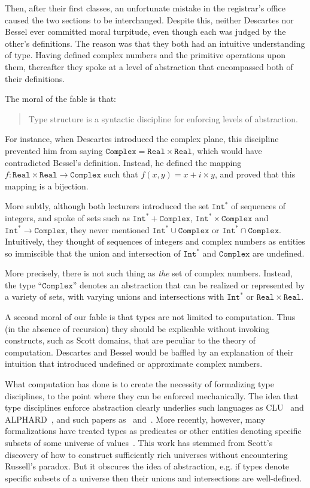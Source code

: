 \documentclass[sigplan,screen,nonacm,balance=false]{acmart}
\makeatletter
\theoremstyle{plain}
\newcommand{\eg}{e.g.\@\xspace}
\newcommand{\Real}{\mathtt{Real}}
\newcommand{\Complex}{\mathtt{Complex}}
\newcommand{\Int}{\mathtt{Int}}
\makeatother
\begin{document}
Then, after their first classes, an unfortunate mistake in the registrar's office caused the two sections to be interchanged.
Despite this, neither Descartes nor Bessel ever committed moral turpitude, even though each was judged by the other's definitions.
The reason was that they both had an intuitive understanding of type.
Having defined complex numbers and the primitive operations upon them, thereafter they spoke at a level of abstraction that encompassed both of their definitions.

The moral of the fable is that:

\begin{quote}
  Type structure is a syntactic discipline for enforcing levels of abstraction.
\end{quote}

For instance, when Descartes introduced the complex plane, this discipline prevented him from saying 
$\Complex = \Real \times \Real$,
which would have contradicted Bessel's definition.
Instead, he defined the mapping
$f : \Real \times \Real \to \Complex$ such that $f(x, y) = x + i \times y$,
and proved that this mapping is a bijection.

More subtly, although both lecturers introduced the set $\Int^*$ of sequences of integers, and spoke of sets such as $\Int^* + \Complex$, $\Int^* \times \Complex$ and $\Int^* \to \Complex$, they never mentioned $\Int^* \cup \Complex$ or $\Int^* \cap \Complex$.
Intuitively, they thought of sequences of integers and complex numbers as entities so immiscible that the union and intersection of $\Int^*$ and $\Complex$ are undefined.

More precisely, there is not such thing as \emph{the} set of complex numbers.
Instead, the type ``$\Complex$'' denotes an abstraction that can be realized or represented by a variety of sets, with varying unions and intersections with $\Int^*$ or $\Real \times \Real$.

A second moral of our fable is that types are not limited to computation.
Thus (in the absence of recursion) they should be explicable without invoking constructs, such as Scott domains, that are peculiar to the theory of computation.
Descartes and Bessel would be baffled by an explanation of their intuition that introduced undefined or approximate complex numbers.

What computation has done is to create the necessity of formalizing type disciplines, to the point where they can be enforced mechanically.
The idea that type disciplines enforce abstraction clearly underlies such languages as CLU~\citep{CLU} and ALPHARD~\citep{Alphard}, and such papers as~\citep{not-sets} and~\citep{polymorphism}.
More recently, however, many formalizations have treated types as predicates or other entities denoting specific subsets of some universe of values~\citep{polytype,retract,applicative,repindep,polydata}.
This work has stemmed from Scott's discovery of how to construct sufficiently rich universes without encountering Russell's paradox.
But it obscures the idea of abstraction, \eg if types denote specific subsets of a universe then their unions and intersections are well-defined.
\end{document}
